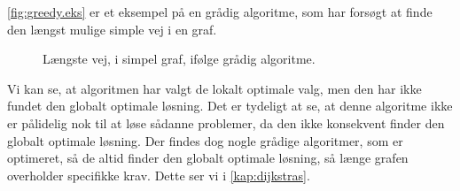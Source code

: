 \autoref{fig:greedy.eks} er et eksempel på en grådig algoritme, som har forsøgt at finde den længst mulige simple vej i en graf.

\begin{figure}[H]
\centering
	\caption{Længste vej, i simpel graf, ifølge grådig algoritme.}
	\label{fig:greedy.eks}
\end{figure}

Vi kan se, at algoritmen har valgt de lokalt optimale valg, men den har ikke fundet den globalt optimale løsning. Det er tydeligt at se, at denne algoritme ikke er pålidelig nok til at løse sådanne problemer, da den ikke konsekvent finder den globalt optimale løsning. Der findes dog nogle grådige algoritmer, som er optimeret, så de altid finder den globalt optimale løsning, så længe grafen overholder specifikke krav. Dette ser vi i \autoref{kap:dijkstras}.

